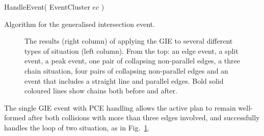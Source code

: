 \begin{algorithm} [htb]
\begin{footnotesize}
  HandleEvent( EventCluster $ec$ ) 
\end{footnotesize}
  \caption{Algorithm for the generalised intersection event.
  }
  \label{code:gie_pseudocode}
\end{algorithm}

\begin{figure}
  \centering
  \def\svgwidth{0.5\columnwidth}
  
  \caption[Results of the GIE]{\label{fig:skel_gie_saves}The results (right column) of applying the GIE to several different types of situation (left column). From the top: an edge event, a split event, a peak event, one pair of collapsing non-parallel edges, a three chain situation, four pairs of collapsing non-parallel edges and an event that includes a straight line and parallel edges. Bold solid coloured lines show chains both before and after.}
\end{figure}

The single GIE event with PCE handling allows the active plan to remain well-formed after both collisions with more than three edges involved, and successfully handles the loop of two situation, as in Fig.~\ref{fig:skel_gie_saves}. 

